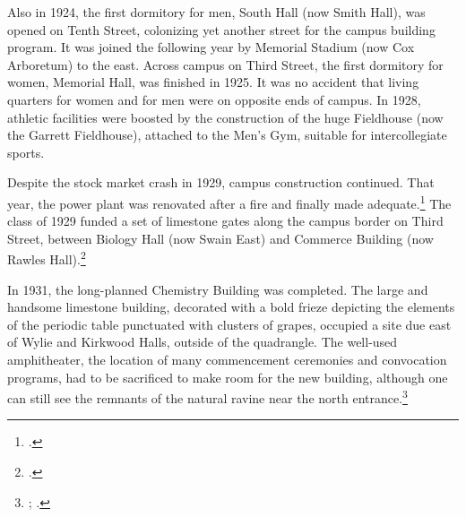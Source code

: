 \documentclass[
  american,
  letterpaper,
]{scrreprt}
\begin{document}
Also in 1924, the first dormitory for men, South Hall (now Smith Hall),
was opened on Tenth Street, colonizing yet another street for the campus
building program. It was joined the following year by Memorial Stadium
(now Cox Arboretum) to the east. Across campus on Third Street, the
first dormitory for women, Memorial Hall, was finished in 1925. It was
no accident that living quarters for women and for men were on opposite
ends of campus. In 1928, athletic facilities were boosted by the
construction of the huge Fieldhouse (now the Garrett Fieldhouse),
attached to the Men's Gym, suitable for intercollegiate sports.

Despite the stock market crash in 1929, campus construction continued.
That year, the power plant was renovated after a fire and finally made
adequate.\footnote{.} The class of 1929 funded a set of
limestone gates along the campus border on Third Street, between Biology
Hall (now Swain East) and Commerce Building (now Rawles
Hall).\footnote{.}

In 1931, the long-planned Chemistry Building was completed. The large
and handsome limestone building, decorated with a bold frieze depicting
the elements of the periodic table punctuated with clusters of grapes,
occupied a site due east of Wylie and Kirkwood Halls, outside of the
quadrangle. The well-used amphitheater, the location of many
commencement ceremonies and convocation programs, had to be sacrificed
to make room for the new building, although one can still see the
remnants of the natural ravine near the north entrance.\footnote{;
  .}
\end{document}
